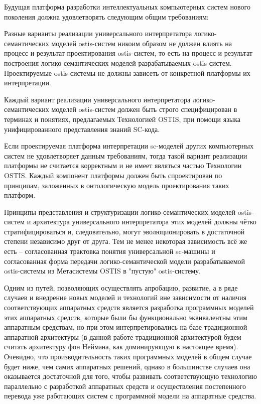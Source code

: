 Будущая платформа разработки интеллектуальных компьютерных систем нового поколения должна удовлетворять следующим
общим требованиям:
\begin{scnitemize}
    \item Разные варианты реализации универсального интерпретатора логико-семантических моделей ostis-систем никоим
    образом не должен влиять на процесс и результат проектирования ostis-систем, то есть на процесс и результат
    построения логико-семантических моделей разрабатываемых ostis-систем. Проектируемые ostis-системы не должны зависеть
    от конкретной платформы их интерпретации.
    \item Каждый вариант реализации универсального интерпретатора логико-семантических моделей ostis-систем должен быть
    строго специфицирован в терминах и понятиях, предлагаемых Технологией OSTIS, при помощи языка унифицированного
    представления знаний SC-кода.
\end{scnitemize}

Если проектируемая платформа интерпретации sc-моделей других компьютерных систем не удовлетворяет данным требованиям,
тогда такой вариант реализации платформы не считается корректным и не имеет являться частью Технологии OSTIS. Каждый
компонент платформы должен быть спроектирован по принципам, заложенных в онтологическую модель проектирования таких
платформ.

Принципы представления и структуризации логико-семантических моделей ostis-систем и архитектура универсального
интерпретатора этих моделей должны чётко стратифицироваться и, следовательно, могут эволюционировать в достаточной
степени независимо друг от друга. Тем не менее некоторая зависимость всё же есть – согласованная трактовка понятия
универсальной sc-машины и согласованная форма передачи логико-семантической модели разрабатываемой ostis-системы из
Метасистемы OSTIS в "пустую" ostis-систему.

Одним из путей, позволяющих осуществлять апробацию, развитие, а в ряде случаев и внедрение новых моделей и технологий
вне зависимости от наличия соответствующих аппаратных средств является разработка программных моделей этих аппаратных
средств, которые были бы функционально эквивалентны этим аппаратным средствам, но при этом интерпретировались на базе
традиционной аппаратной архитектуры (в данной работе традиционной архитектурой будем считать архитектуру фон Неймана,
как доминирующую в настоящее время). Очевидно, что производительность таких программных моделей в общем случае будет
ниже, чем самих аппаратных решений, однако в большинстве случаев она оказывается достаточной для того, чтобы развивать
соответствующую технологию параллельно с разработкой аппаратных средств и осуществления постепенного перевода уже
работающих систем с программной модели на аппаратные средства.

